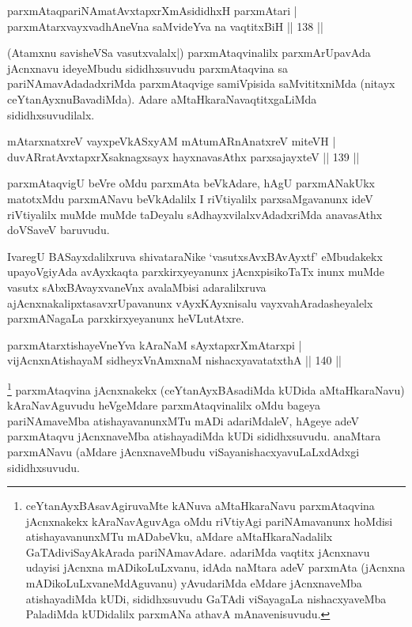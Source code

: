 \begin{shl}
parxmAtaqpariNAmatAvxtapxrXmAsididhxH parxmAtari |\\
parxmAtarxvayxvadhAneVna saMvideYva na vaqtitxBiH \hfill || 138 ||
\end{shl}

\begin{artha}%
(Atamxnu savisheVSa vasutxvalalx|) parxmAtaqvinalilx parxmArUpavAda jAcnxnavu ideyeMbudu sididhxsuvudu parxmAtaqvina sa pariNAmavAdadadxriMda parxmAtaqvige  samiVpisida saMvititxniMda (nitayx ceYtanAyxnuBavadiMda). Adare aMtaHkaraNavaqtitxgaLiMda sididhxsuvudilalx.
\end{artha}


\begin{shl}
mAtarxnatxreV vayxpeVkASxyAM mAtumARnAnatxreV miteVH |\\
duvARratAvxtapxrXsaknagxsayx hayxnavasAthx parxsajayxteV \hfill || 139 ||
\end{shl}

\begin{artha}
parxmAtaqvigU beVre oMdu parxmAta beVkAdare, hAgU parxmANakUkx matotxMdu parxmANavu beVkAdalilx I riVtiyalilx parxsaMgavanunx ideV riVtiyalilx muMde muMde taDeyalu sAdhayxvilalxvAdadxriMda anavasAthx doVSaveV baruvudu.

IvaregU BASayxdalilxruva shivataraNike `vasutxsAvxBAvAyxtf' eMbudakekx upayoVgiyAda avAyxkaqta parxkirxyeyanunx jAcnxpisikoTaTx inunx muMde vasutx sAbxBAvayxvaneVnx avalaMbisi adaralilxruva ajAcnxnakalipxtasavxrUpavanunx vAyxKAyxnisalu vayxvahAradasheyalelx parxmANagaLa parxkirxyeyanunx heVLutAtxre.
\end{artha}

\begin{shl}
parxmAtarxtishayeVneYva kAraNaM sAyxtapxrXmAtarxpi |\\
vijAcnxnAtishayaM sidheyxVnAmxnaM nishacxyavatatxthA \hfill || 140 ||
\end{shl}

\begin{artha}%
\footnote{ceYtanAyxBAsavAgiruvaMte kANuva aMtaHkaraNavu parxmAtaqvina jAcnxnakekx kAraNavAguvAga oMdu riVtiyAgi pariNAmavanunx hoMdisi atishayavanunxMTu mADabeVku, aMdare aMtaHkaraNadalilx GaTAdiviSayAkArada pariNAmavAdare. adariMda vaqtitx jAcnxnavu udayisi jAcnxna mADikoLuLxvanu, idAda naMtara adeV parxmAta (jAcnxna mADikoLuLxvaneMdAguvanu) yAvudariMda eMdare jAcnxnaveMba atishayadiMda kUDi, sididhxsuvudu GaTAdi viSayagaLa nishacxyaveMba PaladiMda kUDidalilx parxmANa athavA mAnavenisuvudu.} parxmAtaqvina jAcnxnakekx (ceYtanAyxBAsadiMda kUDida aMtaHkaraNavu) kAraNavAguvudu heVgeMdare parxmAtaqvinalilx oMdu bageya pariNAmaveMba  atishayavanunxMTu mADi adariMdaleV, hAgeye adeV parxmAtaqvu jAcnxnaveMba atishayadiMda kUDi sididhxsuvudu. anaMtara parxmANavu (aMdare jAcnxnaveMbudu viSayanishacxyavuLaLxdAdxgi sididhxsuvudu.
\end{artha}

